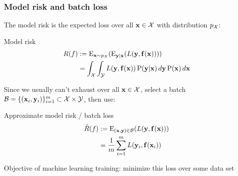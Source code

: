 \begin{frame}
    \frametitle{Model risk and batch loss}

    The \alert{model risk} is the expected loss over all $\mathbf{x} \in \mathcal{X}$ with distribution $p_{\mathcal{X}}$:

    \begin{block}{Model risk}
        \vspace{-1em}
        \begin{align*}
            R(f) &:= \operatorname{\mathrm{E}}_{\mathbf{x} \sim p_{\mathcal{X}}}(\operatorname{\mathrm{E}}_{\mathbf{y} \mid \mathbf{x}}(L(\mathbf{y}, \mathbf{f}(\mathbf{x})))) \\
            &= \int_{\mathcal{X}} \int_{\mathcal{Y}} L(\mathbf{y}, \mathbf{f}(\mathbf{x})) \operatorname{\mathrm{P}}(\mathbf{y} | \mathbf{x}) \, d\mathbf{y} \operatorname{\mathrm{P}}(\mathbf{x}) \, d\mathbf{x}
        \end{align*}
    \end{block}
    \pause

    Since we usually can't exhaust over all $\mathbf{x} \in \mathcal{X}$, select a batch $\mathcal{B} = \{(\mathbf{x}_i, \mathbf{y}_i)\}_{i=1}^m \subset \mathcal{X} \times \mathcal{Y}$, then use:

    \begin{block}{Approximate model risk / batch loss}
        \vspace{-1em}
        \begin{align*}
            \hat{R}(f) &:= \operatorname{\mathrm{E}}_{(\mathbf{x}, \mathbf{y}) \in \mathcal{B}}(L(\mathbf{y}, \mathbf{f}(\mathbf{x}))) \\
            &= \frac{1}{m} \sum_{i=1}^m L(\mathbf{y}_i, \mathbf{f}(\mathbf{x}_i))
        \end{align*}
    \end{block}
    \pause

    Objective of machine learning training: \alert{minimize this loss over some data set}
\end{frame}

